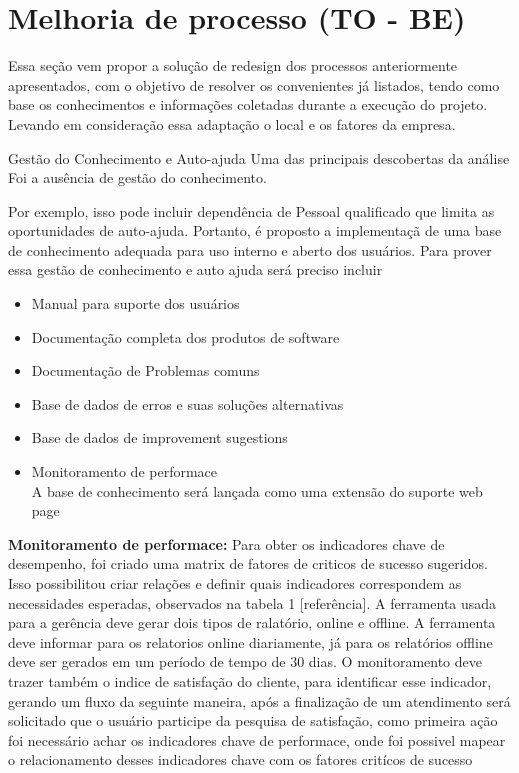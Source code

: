 \section{ Melhoria de processo (TO - BE)}

Essa seção vem  propor a solução de redesign  dos processos
anteriormente apresentados, com o objetivo de resolver os convenientes
já listados, tendo como base os conhecimentos e informações coletadas
durante a execução do projeto. Levando em consideração essa adaptação o
local e os fatores da empresa.


Gestão do Conhecimento e Auto-ajuda Uma das principais descobertas da análise
Foi a ausência de gestão do conhecimento.

Por exemplo, isso pode incluir dependência de
Pessoal qualificado que limita as oportunidades de auto-ajuda.
Portanto, é proposto a implementaçã de  uma base de conhecimento adequada
para uso interno e aberto dos usuários. Para prover essa gestão de conhecimento
e auto ajuda será preciso incluir


\begin{itemize}[noitemsep]

		\item Manual para suporte dos usuários
		\item Documentação completa dos produtos de software
		\item Documentação de Problemas comuns
		\item Base de dados de erros e suas soluções alternativas
		\item Base de dados de improvement sugestions
		\item Monitoramento de performace \\
	A base de conhecimento será lançada como uma extensão do
	suporte web page
\end{itemize}

 \textbf{Monitoramento de performace:}
Para obter os indicadores chave de desempenho, foi criado uma
matrix de fatores de criticos de sucesso sugeridos.
Isso possibilitou criar relações e definir quais indicadores
correspondem as necessidades esperadas, observados na tabela 1 [referência].
	A ferramenta usada para a gerência deve gerar dois tipos de ralatório, online
	e offline. A ferramenta deve informar para os relatorios online diariamente, já
	para os relatórios offline deve ser gerados em um período de tempo de 30 dias.
	O monitoramento deve trazer também o indice de satisfação do cliente, para
	identificar esse indicador, gerando um fluxo da seguinte maneira, após
	a finalização de um atendimento será solicitado que o usuário participe
	da pesquisa de satisfação, como primeira ação foi necessário achar os indicadores chave de performace,
	onde foi possivel mapear o relacionamento desses indicadores chave com os fatores
	critícos de sucesso





